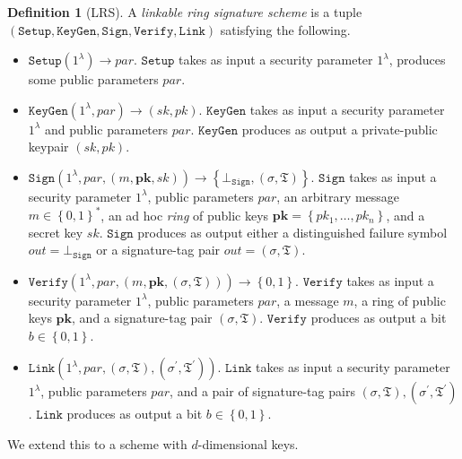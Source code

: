 \documentclass{article}
\theoremstyle{plain}
\theoremstyle{definition}
\newtheorem{defn}{Definition}[section]
\begin{document}
\begin{defn}[LRS]\label{def:lrs}
A \textit{linkable ring signature scheme} is a tuple $(\texttt{Setup}, \texttt{KeyGen}, \texttt{Sign}, \texttt{Verify}, \texttt{Link})$ satisfying the following. 
\begin{itemize}
\item $\texttt{Setup}(1^\lambda) \to \textit{par}$. $\texttt{Setup}$ takes as input a security parameter $1^\lambda$, produces some public parameters $\textit{par}$. 

\item $\texttt{KeyGen}(1^\lambda, \textit{par}) \to (sk, pk)$. $\texttt{KeyGen}$ takes as input a security parameter $1^\lambda$ and public parameters $\textit{par}$. $\texttt{KeyGen}$ produces as output a private-public keypair $(sk, pk)$. 

\item $\texttt{Sign}\left(1^\lambda, \textit{par}, (m, \textbf{pk}, sk)\right) \to \left\{\bot_{\texttt{Sign}}, (\sigma, \mathfrak{T})\right\}$. $\texttt{Sign}$ takes as input a security parameter $1^\lambda$, public parameters $\textit{par}$, an arbitrary message $m \in \left\{0,1\right\}^*$, an ad hoc \textit{ring} of public keys $\textbf{pk} = \left\{pk_1, \ldots, pk_n\right\}$, and a secret key $sk$. $\texttt{Sign}$ produces as output either a distinguished failure symbol $\textit{out} = \bot_{\texttt{Sign}}$ or a signature-tag pair $\textit{out} = (\sigma, \mathfrak{T})$.

\item $\texttt{Verify}\left(1^\lambda, \textit{par}, (m, \textbf{pk}, (\sigma, \mathfrak{T}))\right) \to \left\{0,1\right\}$. $\texttt{Verify}$ takes as input a security parameter $1^\lambda$, public parameters $\textit{par}$, a message $m$, a ring of public keys $\textbf{pk}$, and a signature-tag pair $(\sigma, \mathfrak{T})$. $\texttt{Verify}$ produces as output a bit $b \in \left\{0,1\right\}$.

\item $\texttt{Link}\left(1^\lambda, \textit{par}, (\sigma, \mathfrak{T}), (\sigma^\prime, \mathfrak{T}^\prime)\right)$. $\texttt{Link}$ takes as input a security parameter $1^\lambda$, public parameters $\textit{par}$, and a pair of signature-tag pairs $(\sigma, \mathfrak{T}), (\sigma^\prime, \mathfrak{T}^\prime)$. $\texttt{Link}$ produces as output a bit $b \in \left\{0,1\right\}$. 
\end{itemize}
\end{defn}

We extend this to a scheme with $d$-dimensional keys. 
\end{document}
